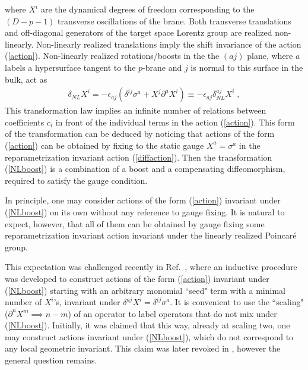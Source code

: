 \documentclass[%
 reprint,
 amsmath,amssymb,
 aps,
]{revtex4-1}
\newcommand{\pd}{\partial}
\begin{document}
where $X^i$ are the dynamical degrees of freedom  corresponding to the $(D-p-1)$ transverse oscillations
of the brane. Both transverse translations and off-diagonal generators of the target space
Lorentz group are realized non-linearly. Non-linearly realized translations imply the shift invariance of the action (\ref{action}).
 Non-linearly realized rotations/boosts in the
the $(aj)$ plane, where $a$ labels a hypersurface tangent to the $p$-brane and $j$ is normal to
this surface in the bulk, act as
\begin{eqnarray}
\label{NLboost}
\delta_{NL} X^i = - \epsilon_{a j} (\delta^{ij} \sigma^a + X^j \partial^a X^{i}) \equiv -\epsilon_{aj}\delta^{aj}_{NL} X^i \; ,
\end{eqnarray}
This transformation law implies an infinite number of relations between
coefficients $c_i$ in front of the individual terms in the action (\ref{action}). This form of the transformation can be deduced by noticing that actions
of the form (\ref{action}) can be obtained by fixing to the static gauge $X^a=\sigma^a$ in the reparametrization invariant action
(\ref{diffaction}). Then the transformation (\ref{NLboost}) is a combination of a boost and a compensating
diffeomorphism, required to satisfy the gauge condition.

In principle, one may consider actions of the form (\ref{action}) invariant under (\ref{NLboost}) on its own  without any reference to  gauge fixing.
It is natural to expect, however, that all of them can be obtained by gauge fixing some reparametrization invariant action
invariant under the linearly realized Poincar\'e group.

This expectation was challenged recently in Ref.~\cite{Gliozzi:2012cx}, where an inductive procedure was developed
to construct actions of the form (\ref{action}) invariant under (\ref{NLboost}) starting with an arbitrary monomial ``seed" term with a minimal number of $X^i$'s, invariant under
$\delta^{aj}X^i= \delta^{ij}  \sigma^a $. It is convenient to use the ``scaling" ($\pd^n X^m \implies n-m$)
of an operator to label operators that do not mix under (\ref{NLboost}).
Initially, it was claimed that this way, already at scaling two, one may construct actions invariant under   (\ref{NLboost}), which do not correspond
to any local geometric invariant. This claim was later revoked in \cite{Meineri:2013ew}, however the general question remains.
\end{document}
